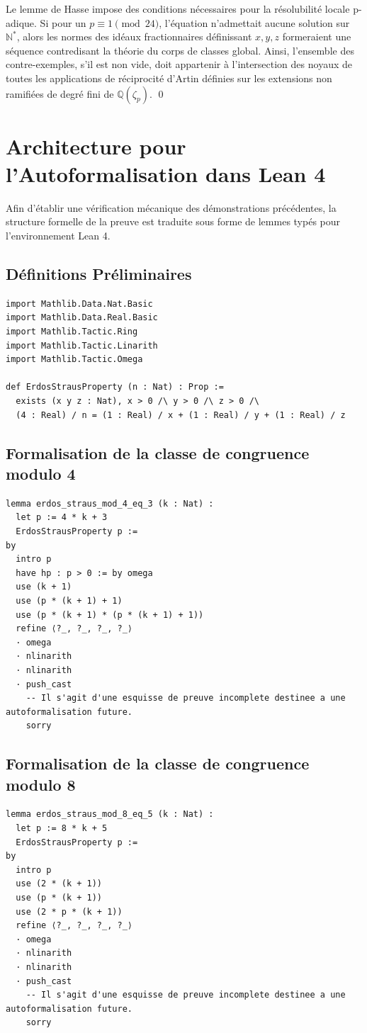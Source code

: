 \documentclass[12pt, a4paper]{article}
\begin{document}
Le lemme de Hasse impose des conditions n\'ecessaires pour la r\'esolubilit\'e locale p-adique. Si pour un $p \equiv 1 \pmod{24}$, l'\'equation n'admettait aucune solution sur $\mathbb{N}^*$, alors les normes des id\'eaux fractionnaires d\'efinissant $x,y,z$ formeraient une s\'equence contredisant la th\'eorie du corps de classes global. Ainsi, l'ensemble des contre-exemples, s'il est non vide, doit appartenir \`a l'intersection des noyaux de toutes les applications de r\'eciprocit\'e d'Artin d\'efinies sur les extensions non ramifi\'ees de degr\'e fini de $\mathbb{Q}(\zeta_p)$.
\qed

\newpage
\section{Architecture pour l'Autoformalisation dans Lean 4}
Afin d'\'etablir une v\'erification m\'ecanique des d\'emonstrations pr\'ec\'edentes, la structure formelle de la preuve est traduite sous forme de lemmes typ\'es pour l'environnement Lean 4.

\subsection{D\'efinitions Pr\'eliminaires}
\begin{verbatim}
import Mathlib.Data.Nat.Basic
import Mathlib.Data.Real.Basic
import Mathlib.Tactic.Ring
import Mathlib.Tactic.Linarith
import Mathlib.Tactic.Omega

def ErdosStrausProperty (n : Nat) : Prop :=
  exists (x y z : Nat), x > 0 /\ y > 0 /\ z > 0 /\
  (4 : Real) / n = (1 : Real) / x + (1 : Real) / y + (1 : Real) / z
\end{verbatim}

\subsection{Formalisation de la classe de congruence modulo 4}
\begin{verbatim}
lemma erdos_straus_mod_4_eq_3 (k : Nat) :
  let p := 4 * k + 3
  ErdosStrausProperty p :=
by
  intro p
  have hp : p > 0 := by omega
  use (k + 1)
  use (p * (k + 1) + 1)
  use (p * (k + 1) * (p * (k + 1) + 1))
  refine ⟨?_, ?_, ?_, ?_⟩
  · omega
  · nlinarith
  · nlinarith
  · push_cast
    -- Il s'agit d'une esquisse de preuve incomplete destinee a une autoformalisation future.
    sorry
\end{verbatim}

\newpage
\subsection{Formalisation de la classe de congruence modulo 8}
\begin{verbatim}
lemma erdos_straus_mod_8_eq_5 (k : Nat) :
  let p := 8 * k + 5
  ErdosStrausProperty p :=
by
  intro p
  use (2 * (k + 1))
  use (p * (k + 1))
  use (2 * p * (k + 1))
  refine ⟨?_, ?_, ?_, ?_⟩
  · omega
  · nlinarith
  · nlinarith
  · push_cast
    -- Il s'agit d'une esquisse de preuve incomplete destinee a une autoformalisation future.
    sorry
\end{verbatim}
\end{document}
